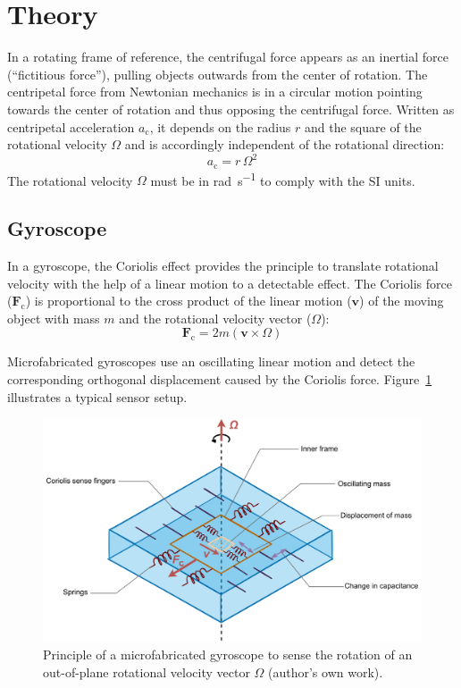 \documentclass[DIV=14]{scrarticle}
\begin{document}
\section{Theory}
In a rotating frame of reference, the centrifugal force appears as an inertial force (“fictitious force”), pulling objects outwards from the center of rotation. The centripetal force from Newtonian mechanics is in a circular motion pointing towards the center of rotation and thus opposing the centrifugal force. Written as centripetal acceleration $a_\mathrm{c}$, it depends on the radius $r$ and the square of the rotational velocity $\mathit{\Omega}$ and is accordingly independent of the rotational direction:
\begin{equation}
    a_\mathrm{c} = r\, \mathit{\Omega}^2
\end{equation}
The rotational velocity $\mathit{\Omega}$ must be in \si{\radian\per\second} to comply with the SI units.


\subsection{Gyroscope}
In a gyroscope, the Coriolis effect provides the principle to translate rotational velocity with the help of a linear motion to a detectable effect. The Coriolis force ($\boldsymbol{F}_\mathrm{c}$) is proportional to the cross product of the linear motion ($\boldsymbol{v}$) of the moving object with mass $m$ and the rotational velocity vector ($\boldsymbol{\mathit{\Omega}}$):
\begin{equation}
    \boldsymbol{F}_\mathrm{c} = 2m (\boldsymbol{v} \times \boldsymbol{\mathit{\Omega}}) 
\end{equation}

Microfabricated gyroscopes use an oscillating linear motion and detect the corresponding orthogonal displacement caused by the Coriolis force. Figure~\ref{fig:gyroscope} illustrates a typical sensor setup. 

\vspace{1em}

\begin{figure}[h]
    \centering
    \includegraphics[width=.8\textwidth]{figures/gyroscope.drawio.pdf}
    \caption{Principle of a microfabricated gyroscope to sense the rotation of an out-of-plane rotational velocity vector $\boldsymbol{\mathit{\Omega}}$ (author's own work).}
    \label{fig:gyroscope}
\end{figure}
\end{document}
